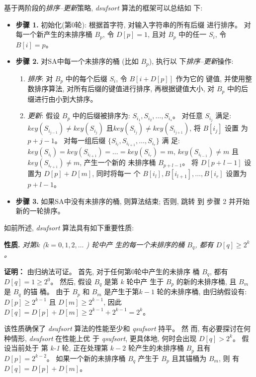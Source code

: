 基于两阶段的\emph{排序--更新}策略, \emph{dsufsort} 算法的框架可以总结如
下:

\begin{itemize}

\item \textbf{步骤 1.} 初始化(第0轮): 根据首字符, 对输入字符串的所有后缀
  进行排序。 对每一个新产生的未排序桶 $B_p$, 令 $D[p] = 1$, 且对 $B_p$
  中的任一 $S_i$, 令 $B[i] = p$。

\item \textbf{步骤 2.} 对SA中每一个未排序的桶 (比如 $B_p$), 执行以
  下\emph{排序--更新}操作:

\begin{enumerate}
\item \emph{排序}: 对 $B_p$ 中的每个后缀 $S_i$, 令 $B[i+D[p]]$ 作为它的
  键值, 并使用整数排序算法, 对所有后缀的键值进行排序, 再根据键值大小,
  对 $B_p$ 中的后缀进行由小到大排序。
\item \emph{更新}: 假设 $B_p$ 中的后缀被排序为: $S_{i_1},
  S_{i_2},\dots,S_{i_s}$。 对任意 $S_{i_j}$ 满足:
  $key(S_{i_{j-1}}) \neq key(S_{i_j})$
  且$key(S_{i_j}) \neq key(S_{i_{j+1}})$, 将 $B[i_j]$ 设置
  为 $p+j-1$。 对每一组后缀 $\{S_{i_l}, S_{i_{l+1}},\dots,S_{i_r}\}$ 满
  足: $key(S_{i_l}) = key(S_{i_{l+1}}) = \dots = key(S_{i_r}) = m$,
  $key(S_{i_{l-1}}) \neq m$ 且 $key(S_{i_{r+1}}) \neq m$, 产生一个新的
  未排序桶 $B_{p+l-1}$。 将 $D[p+l-1]$ 设置为 $D[p] + D[m]$, 同时将每一
  个 $B[i_l], B[i_{l+1}], \dots, B[i_r]$ 设置为 $p+l-1$。
\end{enumerate}

\item \textbf{步骤 3.} 如果SA中没有未排序的桶, 则算法结束; 否则, 跳转
  到 步骤 2 并开始新的一轮排序。

\end{itemize}

如前所述, \emph{dsufsort} 算法具有如下重要性质:


\textbf{性质.} \emph{对第$k$ \emph{(}$k = 0,1,2,\dots$ \emph{)} 轮中产
  生的每一个未排序的桶 $B_q$, 都有 $D[q] \geq 2^k$。}


\textbf{证明：} 由归纳法可证。 首先, 对于任何第0轮中产生的未排序
桶 $B_q$, 都有 $D[q] = 1 \geq 2^0$。  然后, 假设 $B_q$ 是第 $k$ 轮中产
生于 $B_p$ 的新的未排序桶, 且 $B_m$ 是 $B_q$ 的锚
桶。 由于 $B_p$ 和 $B_m$ 是产生于第$k-1$ 轮的未排序桶, 由归纳假设有:
$D[p] \geq 2^{k-1}$ 且 $D[m] \geq 2^{k-1}$, 因此
$D[q] = D[p] + D[m] \geq 2^{k-1} + 2^{k-1} = 2^k$。


该性质确保了 \emph{dsufsort} 算法的性能至少和 \emph{qsufsort} 持平。 然
而, 有必要探讨在何种情形, \emph{dsufsort} 在性能上优
于 \emph{qsufsort}, 更具体地, 何时会出现 $D[q] > 2^k$。 假设当前处于
第 \emph{k-1} 轮, 正在处理第 $k-2$ 轮产生的未排序桶 $B_p$ 且有 $D[p] =
2^{k-2}$。 如果一个新的未排序桶 $B_q$ 产生于 $B_p$ 且其锚桶为 $B_m$, 则
有 $D[q] = D[p] + D[m]$。

